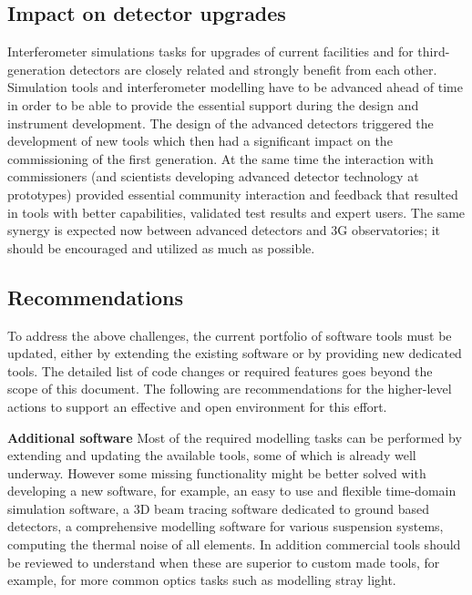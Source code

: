 \subsection{Impact on detector upgrades}
Interferometer simulations tasks for upgrades of current facilities and for third-generation detectors are closely related and strongly benefit from each other. Simulation tools and interferometer modelling have to be advanced ahead of time in order to be able to provide the essential
support during the design and instrument development. The design of the advanced detectors triggered the development of new tools which then had a significant impact on the commissioning of the first generation. At the same time the interaction with commissioners (and scientists developing advanced detector
technology at prototypes) provided essential community interaction and feedback that resulted in tools with better capabilities, validated test results and expert users. The same synergy is expected now between advanced detectors and 3G observatories; it should be encouraged and utilized as much as possible.

\subsection{Recommendations}
To address the above challenges, the current portfolio of software tools must be updated, either by extending the existing software or by providing new dedicated tools. The detailed list of code changes or required features goes beyond the scope of this document. The following are recommendations for the higher-level actions to support an effective and open environment for this effort.

\textbf{Additional software}
Most of the required modelling tasks can be performed by extending and updating the available tools, some of which is already well underway. However some missing functionality might be better solved with developing a new software, for example, an easy to use and flexible time-domain simulation software, a 3D beam tracing software dedicated to ground based detectors, a comprehensive modelling software for various suspension systems, computing the thermal noise of all elements. In addition commercial tools should be reviewed to understand when these are superior to custom made tools, for example, for more common optics tasks such as modelling stray light.

